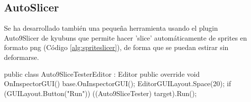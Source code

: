 \subsection{AutoSlicer}

Se ha desarrollado también una pequeña herramienta usando el plugin Auto9Slicer\cite{Auto9Slicer} de kyubuns que permite hacer 'slice' automáticamente de sprites en formato png (Código \ref{alg:spriteslicer}), de forma que se puedan estirar sin deformarse. 

\begin{mypython}
public class Auto9SliceTesterEditor : Editor
{
    public override void OnInspectorGUI()
    {
        base.OnInspectorGUI();
        EditorGUILayout.Space(20);
        if (GUILayout.Button("Run")) ((Auto9SliceTester) target).Run();
    }
}


\end{mypython}
